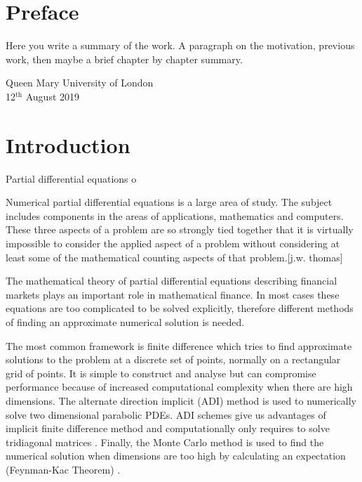 \documentclass[12pt, oneside]{book}
\theoremstyle{plain}
\theoremstyle{definition}
\begin{document}
\chapter*{Preface}
Here  you write a summary of the work. A paragraph on the motivation, previous work, then maybe a brief chapter by chapter summary. 

\lipsum[100]%



\begin{flushright}
Queen Mary University of London\\
12${}^{\text{th}}$ August 2019
\end{flushright}


\tableofcontents

\chapter{Introduction}

Partial differential equations o


Numerical partial differential equations is a large area of study. The subject includes components in the areas of applications, mathematics and computers. These three aspects of a problem are so strongly tied together that it is virtually impossible to consider the applied aspect of a problem without considering at least some of the mathematical counting aspects of that problem.[j.w. thomas]

The mathematical theory of partial differential equations describing financial markets plays an important role in mathematical finance. In most cases these equations are too complicated to be solved explicitly, therefore different methods of finding an approximate numerical solution is needed.

The most common framework is finite difference which tries to find approximate solutions to the problem at a discrete set of points, normally on a rectangular grid of points. It is simple to construct and analyse but can compromise performance because of increased computational complexity when there are high dimensions. The alternate direction implicit (ADI) method is used to numerically solve two dimensional parabolic PDEs. ADI schemes give us advantages of implicit finite difference method and computationally only requires to solve tridiagonal matrices \cite{thomas}. Finally, the Monte Carlo method is used to find the numerical solution when dimensions are too high by calculating an expectation (Feynman-Kac Theorem) \cite{klebaner}.
\end{document}

